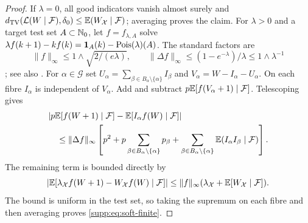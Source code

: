 \begin{proof}
If $\lambda=0$, all good indicators vanish almost surely and
$d_{\mathrm{TV}}(\mathcal L(W\mid\mathcal F),\delta_0)\le
\mathbb E(W_{\mathcal X}\mid\mathcal F)$; averaging proves the claim.
For $\lambda>0$ and a target test set $A\subset\mathbb N_0$, let $f=f_{\lambda,A}$ solve
$\lambda f(k+1)-kf(k)=\mathbf 1_A(k)-\operatorname{Pois}(\lambda)(A)$.
The standard factors are
\[
 \|f\|_\infty\le1\wedge\sqrt{2/(e\lambda)},\qquad
 \|\Delta f\|_\infty\le(1-e^{-\lambda})/\lambda
                         \le1\wedge\lambda^{-1}
\]
\cite[(2.15)]{Krokowski2017}; see also
\cite[(2.4)]{Rollin2012SteinFactors}.
For $\alpha\in\mathcal G$ set
$U_\alpha=\sum_{\beta\in B_\alpha\setminus\{\alpha\}}I_\beta$ and
$V_\alpha=W-I_\alpha-U_\alpha$. On each fibre $I_\alpha$ is independent
of $V_\alpha$. Add and subtract
$p\mathbb E[f(V_\alpha+1)\mid\mathcal F]$. Telescoping gives
\begin{align*}
 &|p\mathbb E[f(W+1)\mid\mathcal F]-\mathbb E[I_\alpha f(W)\mid\mathcal F]|\\
 &\quad\le\|\Delta f\|_\infty
 \left[p^2+p\sum_{\beta\in B_\alpha\setminus\{\alpha\}}p_\beta
             +\sum_{\beta\in B_\alpha\setminus\{\alpha\}}
                            \mathbb E(I_\alpha I_\beta\mid\mathcal F)\right].
\end{align*}
The remaining term is bounded directly by
\[
 |\mathbb E[\lambda_{\mathcal X}f(W+1)-W_{\mathcal X}f(W)\mid\mathcal F]|
 \le\|f\|_\infty
                  (\lambda_{\mathcal X}+\mathbb E[W_{\mathcal X}\mid\mathcal F]).
\]
The bound is uniform in the test set, so taking the supremum on each
fibre and then averaging proves \eqref{supp:eq:soft-finite}.
\end{proof}

